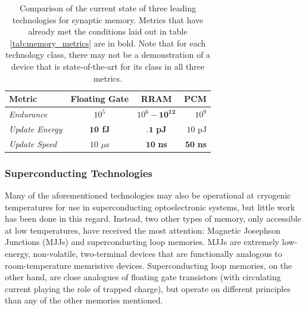 \documentclass[twocolumn]{article}
\begin{document}
\begin{table}[h!]
  \begin{center}
    \label{tab:memory_comparison}
    \begin{tabular}{l|c|c|r} %
      \textbf{Metric} & \textbf{Floating Gate} & \textbf{RRAM} &\textbf{PCM} \\
      \hline
      \textit{Endurance} & $10^{5}$ & $10^{6}-\mathbf{10^{12}}$ & $10^{9}$  \\
      \textit{Update Energy} & \textbf{$\textbf{10}$ fJ} & $\textbf{.1}$ \textbf{pJ} & $10$ pJ\\
      \textit{Update Speed} & $10$ $\mu$s  & $\textbf{10}$ \textbf{ns} & $\textbf{50}$ \textbf{ns}\\
    \end{tabular}
    \caption{Comparison of the current state of three leading technologies for synaptic memory. Metrics that have already met the conditions laid out in table \ref{tab:memory_metrics} are in bold. Note that for each technology class, there may not be a demonstration of a device that is state-of-the-art for its class in all three metrics.}
  \end{center}
\end{table}

\subsubsection{Superconducting Technologies}
Many of the aforementioned technologies may also be operational at cryogenic temperatures for use in superconducting optoelectronic systems, but little work has been done in this regard. Instead, two other types of memory, only accessible at low temperatures, have received the most attention: Magnetic Josephson Junctions (MJJs) and superconducting loop memories. MJJs are extremely low-energy, non-volatile, two-terminal devices that are functionally analogous to room-temperature memristive devices. Superconducting loop memories, on the other hand, are close analogues of floating gate transistors (with circulating current playing the role of trapped charge), but operate on different principles than any of the other memories mentioned.
\end{document}
